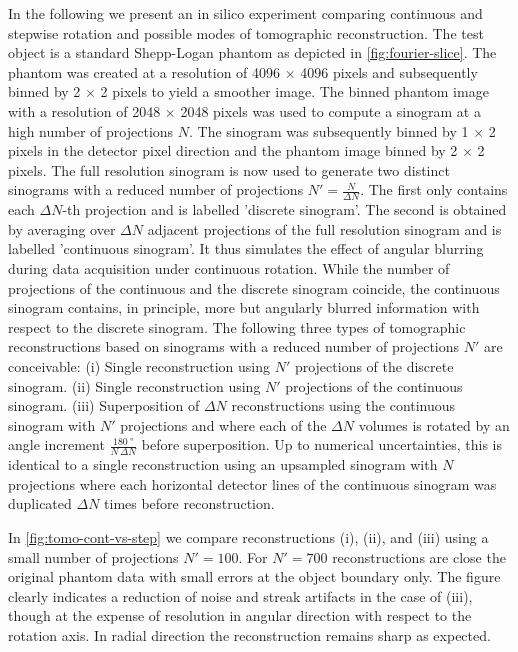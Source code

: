 \documentclass[
twoside,
openright,
titlepage,
numbers=noenddot,
headinclude,
fleqn,
a4paper,
footinclude=true,
cleardoublepage=empty,
abstractoff,
BCOR=5mm,
paper=a4,
fontsize=11pt,
british,ngerman,american,
]{scrreprt}
\begin{document}
In the following we present an in silico experiment comparing
continuous and stepwise rotation and possible modes of tomographic
reconstruction.  The test object is a standard Shepp-Logan phantom as
depicted in \cref{fig:fourier-slice}.  The phantom was created at a
resolution of 4096 $\times$ 4096 pixels and subsequently binned by 2
$\times$ 2 pixels to yield a smoother image. The binned phantom image
with a resolution of 2048 $\times$ 2048 pixels was used to compute a
sinogram at a high number of projections $N$.  The sinogram was
subsequently binned by 1 $\times$ 2 pixels in the detector pixel
direction and the phantom image binned by 2 $\times$ 2 pixels.  The
full resolution sinogram is now used to generate two distinct
sinograms with a reduced number of projections $N'=\frac{N}{\Delta
  N}$.  The first only contains each $\Delta N$-th projection and is
labelled 'discrete sinogram'.  The second is obtained by averaging
over $\Delta N$ adjacent projections of the full resolution sinogram
and is labelled 'continuous sinogram'.  It thus simulates the effect
of angular blurring during data acquisition under continuous
rotation.  While the number of projections of the continuous and the
discrete sinogram coincide, the continuous sinogram contains, in
principle, more but angularly blurred information with respect to the
discrete sinogram.  The following three types of tomographic
reconstructions based on sinograms with a reduced number of
projections $N'$ are conceivable: (i) Single reconstruction using $N'$
projections of the discrete sinogram.  (ii) Single reconstruction
using $N'$ projections of the continuous sinogram.  (iii)
Superposition of $\Delta N$ reconstructions using the continuous
sinogram with $N'$ projections and where each of the $\Delta N$
volumes is rotated by an angle increment
$\frac{\SI{180}{\degree}}{N\,\Delta N}$ before superposition.  Up to
numerical uncertainties, this is identical to a single reconstruction
using an upsampled sinogram with $N$ projections where each horizontal
detector lines of the continuous sinogram was duplicated $\Delta N$
times before reconstruction.

In \cref{fig:tomo-cont-vs-step} we compare reconstructions (i), (ii),
and (iii) using a small number of projections $N'=\num{100}$.  For
$N'=\num{700}$  reconstructions are close the original phantom data
with small errors at the object boundary only.  The figure clearly
indicates a reduction of noise and streak artifacts in the case of
(iii), though at the expense of resolution in  angular direction
with respect to the rotation axis.  In radial direction the
reconstruction remains sharp as expected.
\end{document}
